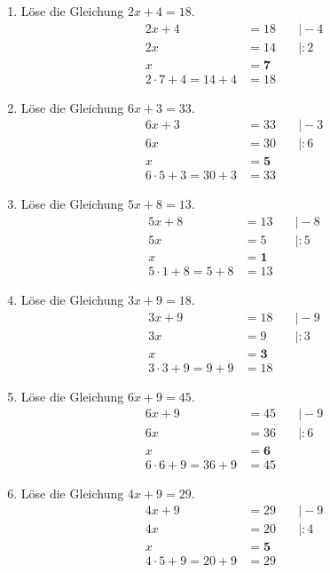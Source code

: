 \documentclass[a4paper,10pt]{article} %
\begin{document}
\begin{enumerate}

  \item Löse die Gleichung \(2x + 4 = 18\).
  \[
  \begin{aligned}
    2x + 4 &= 18 \quad &\big| - 4 \\
    2x &= 14 \quad &\big| : 2 \\
    x &= \mathbf{7} \\
    2 \cdot 7 + 4 = 14 + 4 &= 18
  \end{aligned}
  \]

  \item Löse die Gleichung \(6x + 3 = 33\).
  \[
  \begin{aligned}
    6x + 3 &= 33 &\quad\big| - 3 \\
    6x &= 30 &\quad\big| : 6 \\
    x &= \mathbf{5} \\
    6 \cdot 5 + 3 = 30 + 3 &= 33
  \end{aligned}
  \]

  \item Löse die Gleichung \(5x + 8 = 13\).
  \[
  \begin{aligned}
    5x + 8 &= 13 &\quad\big| - 8 \\
    5x &= 5 &\quad\big| : 5 \\
    x &= \mathbf{1} \\
    5 \cdot 1 + 8 = 5 + 8 &= 13
  \end{aligned}
  \]

  \item Löse die Gleichung \(3x + 9 = 18\).
  \[
  \begin{aligned}
    3x + 9 &= 18 &\quad\big| - 9 \\
    3x &= 9 &\quad\big| : 3 \\
    x &= \mathbf{3} \\
    3 \cdot 3 + 9 = 9 + 9 &= 18
  \end{aligned}
  \]

  \item Löse die Gleichung \(6x + 9 = 45\).
  \[
  \begin{aligned}
    6x + 9 &= 45 &\quad\big| - 9 \\
    6x &= 36 &\quad\big| : 6 \\
    x &= \mathbf{6} \\
    6 \cdot 6 + 9 = 36 + 9 &= 45
  \end{aligned}
  \]

  \item Löse die Gleichung \(4x + 9 = 29\).
  \[
  \begin{aligned}
    4x + 9 &= 29 &\quad\big| - 9 \\
    4x &= 20 &\quad\big| : 4 \\
    x &= \mathbf{5} \\
    4 \cdot 5 + 9 = 20 + 9 &= 29
  \end{aligned}
  \]


\end{enumerate}
\end{document}

